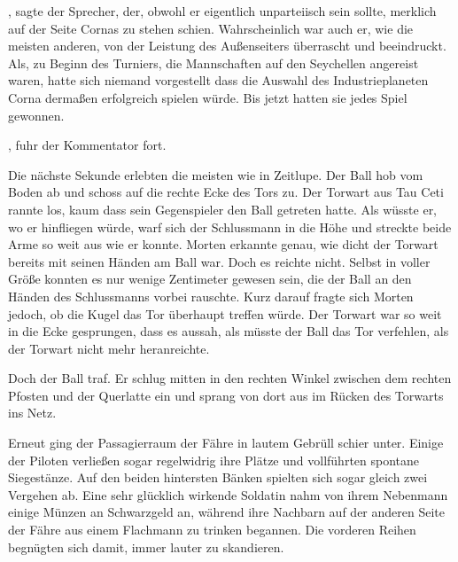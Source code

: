 \par

, sagte der Sprecher, der, obwohl er eigentlich unparteiisch sein sollte, merklich auf der Seite Cornas zu stehen schien. Wahrscheinlich war auch er, wie die meisten anderen, von der Leistung des Außenseiters überrascht und beeindruckt. Als, zu Beginn des Turniers, die Mannschaften auf den Seychellen angereist waren, hatte sich niemand vorgestellt dass die Auswahl des Industrieplaneten Corna dermaßen erfolgreich spielen würde. Bis jetzt hatten sie jedes Spiel gewonnen.

\par

, fuhr der Kommentator fort. 

\par

Die nächste Sekunde erlebten die meisten wie in Zeitlupe. Der Ball hob vom Boden ab und schoss auf die rechte Ecke des Tors zu. Der Torwart aus Tau Ceti rannte los, kaum dass sein Gegenspieler den Ball getreten hatte. Als wüsste er, wo er hinfliegen würde, warf sich der Schlussmann in die Höhe und streckte beide Arme so weit aus wie er konnte. Morten erkannte genau, wie dicht der Torwart bereits mit seinen Händen am Ball war. Doch es reichte nicht. Selbst in voller Größe konnten es nur wenige Zentimeter gewesen sein, die der Ball an den Händen des Schlussmanns vorbei rauschte. Kurz darauf fragte sich Morten jedoch, ob die Kugel das Tor überhaupt treffen würde. Der Torwart war so weit in die Ecke gesprungen, dass es aussah, als müsste der Ball das Tor verfehlen, als der Torwart nicht mehr heranreichte.

\par

Doch der Ball traf. Er schlug mitten in den rechten Winkel zwischen dem rechten Pfosten und der Querlatte ein und sprang von dort aus im Rücken des Torwarts ins Netz.

\par

Erneut ging der Passagierraum der Fähre in lautem Gebrüll schier unter. Einige der Piloten verließen sogar regelwidrig ihre Plätze und vollführten spontane Siegestänze. Auf den beiden hintersten Bänken spielten sich sogar gleich zwei Vergehen ab. Eine sehr glücklich wirkende Soldatin nahm von ihrem Nebenmann einige Münzen an Schwarzgeld an, während ihre Nachbarn auf der anderen Seite der Fähre aus einem Flachmann zu trinken begannen. Die vorderen Reihen begnügten sich damit, immer lauter  zu skandieren.

